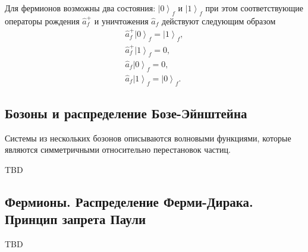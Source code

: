 Для фермионов возможны два состояния: $\left|0\right>_f$ и
$\left|1\right>_f$ при этом соответствующие операторы рождения
$\hat{a}_f^{+}$ и уничтожения $\hat{a}_f$ действуют следующим образом
\begin{eqnarray}
\hat{a}_f^{+}\left|0\right>_f = \left|1\right>_f, 
\nonumber \\
\hat{a}_f^{+}\left|1\right>_f = 0, 
\nonumber \\
\hat{a}_f\left|0\right>_f = 0, 
\nonumber \\
\hat{a}_f\left|1\right>_f = \left|0\right>_f.
\nonumber
\end{eqnarray}


\subsection{Бозоны и распределение Бозе-Эйнштейна}
Системы из нескольких бозонов описываются волновыми функциями, которые
являются симметричными относительно перестановок частиц.

TBD

\subsection{Фермионы. Распределение Ферми-Дирака. Принцип запрета Паули}

TBD
